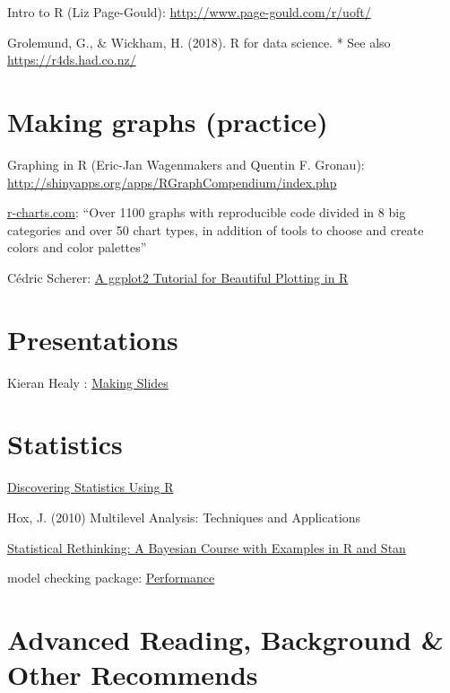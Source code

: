 \documentclass[
]{book}
\begin{document}
Intro to R (Liz Page-Gould): \url{http://www.page-gould.com/r/uoft/}

Grolemund, G., \& Wickham, H. (2018). R for data science.
* See also \url{https://r4ds.had.co.nz/}

\hypertarget{making-graphs-practice}{%
\section{Making graphs (practice)}\label{making-graphs-practice}}

Graphing in R (Eric-Jan Wagenmakers and Quentin F. Gronau): \url{http://shinyapps.org/apps/RGraphCompendium/index.php}

\href{https://r-charts.com/}{r-charts.com}: ``Over 1100 graphs with reproducible code divided in 8 big categories and over 50 chart types, in addition of tools to choose and create colors and color palettes''

Cédric Scherer: \href{https://www.cedricscherer.com/2019/08/05/a-ggplot2-tutorial-for-beautiful-plotting-in-r/}{A ggplot2 Tutorial for Beautiful Plotting in R}

\hypertarget{presentations}{%
\section{Presentations}\label{presentations}}

Kieran Healy : \href{https://kieranhealy.org/blog/archives/2018/03/24/making-slides/}{Making Slides}

\hypertarget{statistics}{%
\section{Statistics}\label{statistics}}

\href{https://www.discoveringstatistics.com/books/discovering-statistics-using-r/}{Discovering Statistics Using R}

Hox, J. (2010) Multilevel Analysis: Techniques and Applications

\href{https://xcelab.net/rm/statistical-rethinking/}{Statistical Rethinking: A Bayesian Course with Examples in R and Stan}

model checking package: \href{https://easystats.github.io/performance/index.html}{Performance}

\hypertarget{advanced-reading-background-other-recommends}{%
\section{Advanced Reading, Background \& Other Recommends}\label{advanced-reading-background-other-recommends}}
\end{document}
